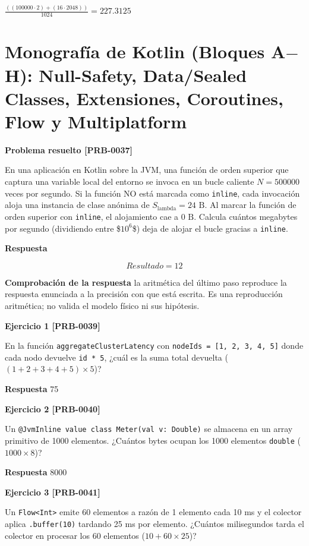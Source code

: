 \documentclass{book}
\begin{document}
\(\frac{\left(\left(100000\cdot 2\right)+\left(16\cdot 2048\right)\right)}{1024} = 227.3125\)

\section{Monografía de Kotlin (Bloques A\(-\)H): Null-Safety, Data/Sealed Classes, Extensiones, Coroutines, Flow y Multiplatform}

\noindent\textbf{Problema resuelto [PRB-0037]}

En una aplicación en Kotlin sobre la JVM, una función de orden superior que captura una variable local del entorno se invoca en un bucle caliente \(N = 500000\) veces por segundo. Si la función NO está marcada como \texttt{inline}, cada invocación aloja una instancia de clase anónima de \(S_{\text{lambda}} = 24\text{ B}\). Al marcar la función de orden superior con \texttt{inline}, el alojamiento cae a \(0\text{ B}\). Calcula cuántos megabytes por segundo (dividiendo entre \$\(10^6\)\$) deja de alojar el bucle gracias a \texttt{inline}.

\noindent\textbf{Respuesta}

\[
Resultado = 12
\]

\noindent\textbf{Comprobación de la respuesta} la aritmética del último paso reproduce la respuesta enunciada a la precisión con que está escrita. Es una reproducción aritmética; no valida el modelo físico ni sus hipótesis.

\noindent\textbf{Ejercicio 1 [PRB-0039]}

En la función \texttt{aggregateClusterLatency} con \texttt{nodeIds = [1, 2, 3, 4, 5]} donde cada nodo devuelve \texttt{id * 5}, ¿cuál es la suma total devuelta (\((1 + 2 + 3 + 4 + 5) \times 5\))?

\noindent\textbf{Respuesta} 75

\noindent\textbf{Ejercicio 2 [PRB-0040]}

Un \texttt{@JvmInline value class Meter(val v: Double)} se almacena en un array primitivo de 1000 elementos. ¿Cuántos bytes ocupan los 1000 elementos \texttt{double} (\(1000 \times 8\))?

\noindent\textbf{Respuesta} 8000

\noindent\textbf{Ejercicio 3 [PRB-0041]}

Un \texttt{Flow<Int>} emite 60 elementos a razón de 1 elemento cada 10 ms y el colector aplica \texttt{.buffer(10)} tardando 25 ms por elemento. ¿Cuántos milisegundos tarda el colector en procesar los 60 elementos (\(10 + 60 \times 25\))?
\end{document}
